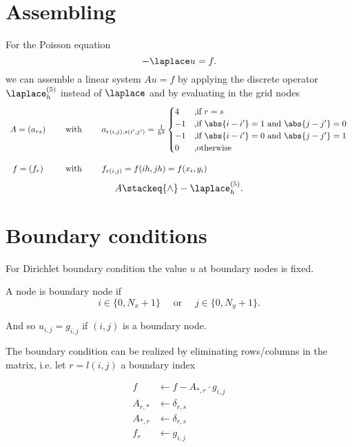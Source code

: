 \section{Assembling}%
\label{sec:Assembling}

For the Poisson equation
\[
-\laplace u = f
.\] 
we can assemble a linear system $Au=f$ by applying the discrete operator $\laplace_{h}^{(5)}$ instead of $\laplace$ and by evaluating in the grid nodes
\[
	\begin{array}{ccl}
	A = (a_{rs}) 
	\quad&\text{ with }\quad 
	&a_{r(i,j),s(i',j')}= \frac{1}{h^{2}}\begin{cases}
		4 &\text{,if } r=s \\
		-1 &\text{,if } \abs{i-i'} = 1 \text{ and } \abs{j-j'} = 0 \\
		-1 &\text{,if } \abs{i-i'} = 0 \text{ and } \abs{j-j'} = 1 \\
		0 &\text{,otherwise}
	\end{cases} \\ \\
	f = (f_{r}) 
	\quad&\text{ with }\quad
	&f_{r(i,j)}=f(ih, jh)=f(x_{i}, y_{i})
	\end{array}
\] 
\[
	 A \stackeq{\wedge} -\laplace_{h}^{(5)}
.\] 

\section{Boundary conditions}%
\label{sec:Boundary condition}
For Dirichlet boundary condition the value $u$ at boundary nodes is fixed.

A node is boundary node if
\[
i \in  \{0, N_{x}+1\} \quad\text{ or }\quad j \in  \{0,N_{y}+1\}
.\] 

And so $u_{i,j} = g_{i,j}$ if $(i,j)$ is a boundary node.

The boundary condition can be realized by eliminating rows/columns in the matrix, i.e. let $r=l(i,j)$ a boundary index

\begin{align*}
	f &\leftarrow f-A_{\ast,r}\cdot g_{i,j} \\
	A_{r,\ast} &\leftarrow \delta_{r,s} \\
	A_{*,r} &\leftarrow \delta_{r,s} \\
	f_{r} &\leftarrow g_{i,j}
\end{align*}

